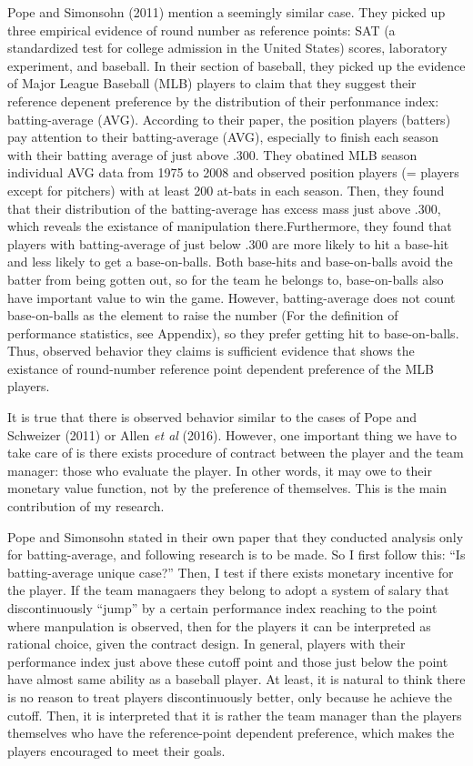 \documentclass[dvipdfmx, 12pt]{article}
\begin{document}
  Pope and Simonsohn (2011) mention a seemingly similar case. They picked up three empirical evidence of round number as reference points: SAT (a standardized test for college admission in the United States) scores, laboratory experiment, and baseball. In their section of baseball, they picked up the evidence of Major League Baseball (MLB) players to claim that they suggest their reference depenent preference by the distribution of their perfonmance index: batting-average (AVG). According to their paper, the position players (batters) pay attention to their batting-average (AVG), especially to finish each season with their batting average of just above .300. They obatined MLB season individual AVG data from 1975 to 2008 and observed position players (= players except for pitchers) with at least 200 at-bats in each season. Then, they found that their distribution of the batting-average has excess mass just above .300, which reveals the existance of manipulation there.Furthermore, they found that players with batting-average of just below .300 are more likely to hit a base-hit and less likely to get a base-on-balls. Both base-hits and base-on-balls avoid the batter from being gotten out, so for the team he belongs to, base-on-balls also have important value to win the game. However, batting-average does not count base-on-balls as the element to raise the number (For the definition of performance statistics, see Appendix), so they prefer getting hit to base-on-balls. Thus, observed behavior they claims is sufficient evidence that shows the existance of round-number reference point dependent preference of the MLB players.

  It is true that there is observed behavior similar to the cases of Pope and Schweizer (2011) or Allen \textit{et al} (2016). However, one important thing we have to take care of is there exists procedure of contract between the player and the team manager: those who evaluate the player. In other words, it may owe to their monetary value function, not by the preference of themselves. This is the main contribution of my research.

  Pope and Simonsohn stated in their own paper that they conducted analysis only for batting-average, and following research is to be made. So I first follow this: ``Is batting-average unique case?'' Then, I test if there exists monetary incentive for the player. If the team managaers they belong to adopt a system of salary that discontinuously ``jump'' by a certain performance index reaching to the point where manpulation is observed, then for the players it can be interpreted as rational choice, given the contract design. In general, players with their performance index just above these cutoff point and those just below the point have almost same ability as a baseball player. At least, it is natural to think there is no reason to treat players discontinuously better, only because he achieve the cutoff. Then, it is interpreted that it is rather the team manager than the players themselves who have the reference-point dependent preference, which makes the players encouraged to meet their goals.
\end{document}
